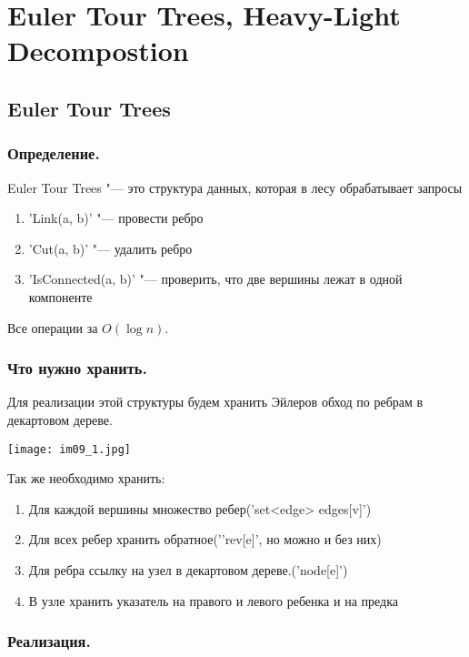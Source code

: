 ﻿\chapter{Euler Tour Trees, Heavy-Light Decompostion}

\section{Euler Tour Trees}
\subsection{Определение.}
Euler Tour Trees "--- это структура данных, которая в лесу обрабатывает запросы
\begin{enumerate}
	\item \cpp'Link(a, b)' "--- провести ребро
	\item \cpp'Cut(a, b)' "--- удалить ребро
	\item \cpp'IsConnected(a, b)' "--- проверить, что две вершины лежат в одной компоненте
\end{enumerate}
Все операции за $O(\log n)$.

\subsection{Что нужно хранить.}

Для реализации этой структуры будем хранить Эйлеров обход по ребрам в декартовом дереве.

\begin{center}
\texttt{[image: im09\_1.jpg]}
\end{center}

Так же необходимо хранить:
\begin{enumerate}
	\item Для каждой вершины множество ребер(\cpp'set<edge> edges[v]')
	\item Для всех ребер хранить обратное('\cpp'rev[e]', но можно и без них)
	\item Для ребра ссылку на узел в декартовом дереве.(\cpp'node[e]')
	\item В узле хранить указатель на правого и левого ребенка и на предка
\end{enumerate}

\subsection{Реализация.}

